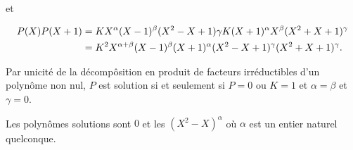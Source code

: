 {{et 

\begin{align*}\ensuremath
P(X)P(X+1)&=KX^\alpha(X-1)^\beta(X^2-X+1)\gamma K(X+1)^\alpha X^\beta(X^2+X+1)^\gamma\\
 &=K^2X^{\alpha+\beta}(X-1)^\beta(X+1)^\alpha(X^2-X+1)^\gamma(X^2+X+1)^\gamma.
\end{align*}

Par unicité de la décompôsition en produit de facteurs irréductibles d'un polynôme non nul, $P$ est solution si et seulement si $P=0$ ou $K=1$ et $\alpha=\beta$ et $\gamma=0$.

Les polynômes solutions sont $0$ et les $(X^2-X)^\alpha$ où $\alpha$ est un entier naturel quelconque.
}
}
